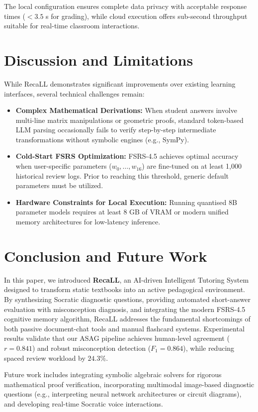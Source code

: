 \documentclass[conference]{IEEEtran}
\begin{document}
The local configuration ensures complete data privacy with acceptable response times ($< 3.5$ s for grading), while cloud execution offers sub-second throughput suitable for real-time classroom interactions.

\section{Discussion and Limitations}
While RecaLL demonstrates significant improvements over existing learning interfaces, several technical challenges remain:
\begin{itemize}
    \item \textbf{Complex Mathematical Derivations:} When student answers involve multi-line matrix manipulations or geometric proofs, standard token-based LLM parsing occasionally fails to verify step-by-step intermediate transformations without symbolic engines (e.g., SymPy).
    \item \textbf{Cold-Start FSRS Optimization:} FSRS-4.5 achieves optimal accuracy when user-specific parameters ($w_0, \dots, w_{16}$) are fine-tuned on at least 1,000 historical review logs. Prior to reaching this threshold, generic default parameters must be utilized.
    \item \textbf{Hardware Constraints for Local Execution:} Running quantised 8B parameter models requires at least 8 GB of VRAM or modern unified memory architectures for low-latency inference.
\end{itemize}

\section{Conclusion and Future Work}
In this paper, we introduced \textbf{RecaLL}, an AI-driven Intelligent Tutoring System designed to transform static textbooks into an active pedagogical environment. By synthesizing Socratic diagnostic questions, providing automated short-answer evaluation with misconception diagnosis, and integrating the modern FSRS-4.5 cognitive memory algorithm, RecaLL addresses the fundamental shortcomings of both passive document-chat tools and manual flashcard systems. Experimental results validate that our ASAG pipeline achieves human-level agreement ($r = 0.841$) and robust misconception detection ($F_1 = 0.864$), while reducing spaced review workload by $24.3\%$.

Future work includes integrating symbolic algebraic solvers for rigorous mathematical proof verification, incorporating multimodal image-based diagnostic questions (e.g., interpreting neural network architectures or circuit diagrams), and developing real-time Socratic voice interactions.
\end{document}
